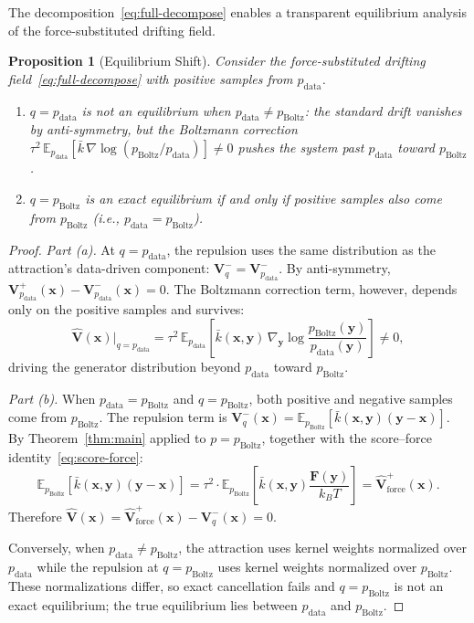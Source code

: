 \documentclass[11pt]{article}
\newtheorem{proposition}[theorem]{Proposition}
\newcommand{\bx}{\mathbf{x}}
\newcommand{\by}{\mathbf{y}}
\newcommand{\bV}{\mathbf{V}}
\newcommand{\bF}{\mathbf{F}}
\newcommand{\E}{\mathbb{E}}
\newcommand{\kbar}{\bar{k}}
\newcommand{\pboltz}{p_{\text{Boltz}}}
\newcommand{\pdata}{p_{\text{data}}}
\newcommand{\kBT}{k_BT}
\begin{document}
The decomposition~\eqref{eq:full-decompose} enables a transparent equilibrium analysis of the force-substituted drifting field.

\begin{proposition}[Equilibrium Shift]
\label{prop:equilibrium}
Consider the force-substituted drifting field~\eqref{eq:full-decompose} with positive samples from $\pdata$.
\begin{enumerate}
    \item[(a)] $q = \pdata$ is \emph{not} an equilibrium when $\pdata \neq \pboltz$: the standard drift vanishes by anti-symmetry, but the Boltzmann correction $\tau^2\,\E_{\pdata}[\kbar\,\nabla\log(\pboltz/\pdata)] \neq 0$ pushes the system past $\pdata$ toward $\pboltz$.
    \item[(b)] $q = \pboltz$ is an exact equilibrium \emph{if and only if} positive samples also come from $\pboltz$ (i.e., $\pdata = \pboltz$).
\end{enumerate}
\end{proposition}

\begin{proof}
\textit{Part (a).}
At $q = \pdata$, the repulsion uses the same distribution as the attraction's data-driven component: $\bV_q^- = \bV_{\pdata}^-$.
By anti-symmetry, $\bV_{\pdata}^+(\bx) - \bV_{\pdata}^-(\bx) = 0$.
The Boltzmann correction term, however, depends only on the positive samples and survives:
\begin{equation}
    \hat{\bV}(\bx)\big|_{q=\pdata} = \tau^2\,\E_{\pdata}\!\left[\kbar(\bx,\by)\,\nabla_\by\log\frac{\pboltz(\by)}{\pdata(\by)}\right] \neq 0,
\end{equation}
driving the generator distribution beyond $\pdata$ toward $\pboltz$.

\textit{Part (b).}
When $\pdata = \pboltz$ and $q = \pboltz$, both positive and negative samples come from $\pboltz$.
The repulsion term is $\bV_q^-(\bx) = \E_{\pboltz}[\kbar(\bx,\by)(\by - \bx)]$.
By Theorem~\ref{thm:main} applied to $p = \pboltz$, together with the score--force identity~\eqref{eq:score-force}:
\begin{equation}
    \E_{\pboltz}[\kbar(\bx,\by)(\by - \bx)] = \tau^2 \cdot \E_{\pboltz}\!\left[\kbar(\bx,\by)\frac{\bF(\by)}{\kBT}\right] = \hat{\bV}_{\text{force}}^+(\bx).
    \label{eq:repulsion-equals-attraction}
\end{equation}
Therefore $\hat{\bV}(\bx) = \hat{\bV}_{\text{force}}^+(\bx) - \bV_q^-(\bx) = 0$.

Conversely, when $\pdata \neq \pboltz$, the attraction uses kernel weights normalized over $\pdata$ while the repulsion at $q = \pboltz$ uses kernel weights normalized over $\pboltz$.
These normalizations differ, so exact cancellation fails and $q = \pboltz$ is not an exact equilibrium; the true equilibrium lies between $\pdata$ and $\pboltz$.
\end{proof}
\end{document}
